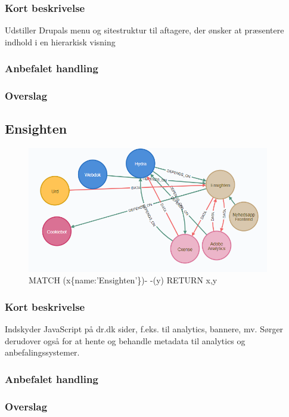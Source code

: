\documentclass{article}
\begin{document}
\subsubsection{Kort beskrivelse}
Udstiller Drupals menu og sitestruktur til aftagere, der ønsker at præsentere indhold i en hierarkisk visning
\subsubsection{Anbefalet handling}
\subsubsection{Overslag}


\subsection{Ensighten}
\begin{figure}[h]
\includegraphics[width=300pt]{Ensighten.PNG}
\caption{MATCH (x\{name:'Ensighten'\})- -(y) RETURN x,y}
\end{figure}
\subsubsection{Kort beskrivelse}
Indskyder JavaScript på dr.dk sider, f.eks. til analytics, bannere, mv. Sørger derudover også for at hente og behandle metadata til analytics og anbefalingssystemer.
\subsubsection{Anbefalet handling}
\subsubsection{Overslag}
\end{document}
